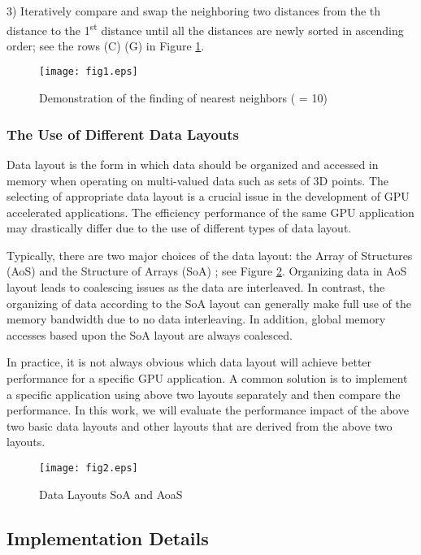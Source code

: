 \documentclass[fleqn,11pt]{wlscirep}
\begin{document}
3) Iteratively compare and swap the neighboring two distances from the th 
distance to the 1\textsuperscript{st} distance until all the  distances are newly sorted 
in ascending order; see the rows (C)  (G) in Figure \ref{fig1:knn}.

\begin{figure}[ht]
	\centering
	\texttt{[image: fig1.eps]}
	\caption{Demonstration of the finding of  nearest neighbors ( = 10)}
	\label{fig1:knn}
\end{figure}

\subsubsection{The Use of Different Data Layouts}

Data layout is the form in which data should be organized and accessed in 
memory when operating on multi-valued data such as sets of 3D points. The 
selecting of appropriate data layout is a crucial issue in the development 
of GPU accelerated applications. The efficiency performance of the same GPU 
application may drastically differ due to the use of different types of data 
layout.

Typically, there are two major choices of the data layout: the Array of 
Structures (AoS) and the Structure of Arrays (SoA) \cite{36}; see Figure 
\ref{fig2:data layout}. Organizing data in AoS layout leads to coalescing issues as the data are 
interleaved. In contrast, the organizing of data according to the SoA layout 
can generally make full use of the memory bandwidth due to no data 
interleaving. In addition, global memory accesses based upon the SoA layout 
are always coalesced. 

In practice, it is not always obvious which data layout will achieve better 
performance for a specific GPU application. A common solution is to 
implement a specific application using above two layouts separately and then 
compare the performance. In this work, we will evaluate the performance 
impact of the above two basic data layouts and other layouts that are 
derived from the above two layouts. 

\begin{figure}[ht]
	\centering
	\texttt{[image: fig2.eps]}
	\caption{Data Layouts SoA and AoaS}
	\label{fig2:data layout}
\end{figure}


\subsection{Implementation Details}
\end{document}

